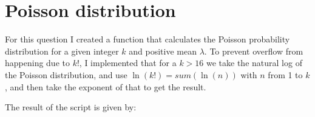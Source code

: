 \section{Poisson distribution}

For this question I created a function that calculates the Poisson probability distribution for a given integer $k$ and positive mean $\lambda$.
To prevent overflow from happening due to $k!$, I implemented that for a $k > 16$ we take the natural log of the Poisson distribution, and use $\ln(k!) = sum(\ln(n))$ with $n$ from 1 to $k$, and then take the exponent of that to get the result.



The result of the script is given by:


